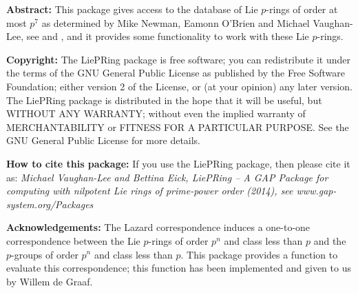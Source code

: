 

{\bf Abstract:}
This package gives access to the database of Lie $p$-rings of order at most 
$p^7$ as determined by Mike Newman, Eamonn O'Brien and Michael Vaughan-Lee, 
see \cite{NOV04} and \cite{OVL05}, and it provides some functionality to 
work with these Lie $p$-rings.
\bigskip

{\bf Copyright:}
The LiePRing package is free software; you can redistribute it under the 
terms of the GNU General Public License as published by the Free Software 
Foundation; either version 2 of the License, or (at your opinion) any 
later version. The LiePRing package is distributed in the hope that it will 
be useful, but WITHOUT ANY WARRANTY; without even the implied warranty of
MERCHANTABILITY or FITNESS FOR A PARTICULAR PURPOSE. See the GNU General 
Public License for more details.
\bigskip

{\bf How to cite this package:}
If you use the LiePRing package, then please cite it as:
{\it Michael Vaughan-Lee and Bettina Eick, LiePRing -- A GAP Package for
computing with nilpotent Lie rings of prime-power order (2014), see
www.gap-system.org/Packages}
\bigskip

{\bf Acknowledgements:}
The Lazard correspondence induces a one-to-one correspondence between the
Lie $p$-rings of order $p^n$ and class less than $p$ and the $p$-groups of 
order $p^n$ and class less than $p$. This package provides a function to 
evaluate this correspondence; this function has been implemented and given
to us by Willem de Graaf. 


